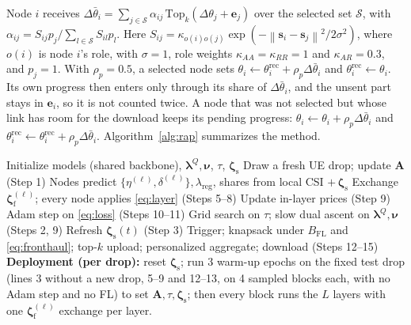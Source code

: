 \documentclass[conference]{IEEEtran}
\newcommand{\norm}[1]{\left\lVert #1 \right\rVert}
\newcommand{\zs}{\boldsymbol{\zeta}_{\mathrm{s}}}
\newcommand{\zf}{\boldsymbol{\zeta}_{\mathrm{f}}}
\begin{document}
Node $i$ receives
$\Delta\bar\theta_i = \sum_{j\in\mathcal{S}} \alpha_{ij}\,
\mathrm{Top}_k(\Delta\theta_j+\mathbf{e}_j)$ over the selected set
$\mathcal{S}$, with $\alpha_{ij} = S_{ij}p_j/\sum_{l\in\mathcal{S}}
S_{il}p_l$. Here $S_{ij} = \kappa_{o(i)o(j)}
\exp(-\norm{\mathbf{s}_i-\mathbf{s}_j}^2/2\sigma^2)$, where $o(i)$ is node
$i$'s role, with $\sigma=1$, role weights $\kappa_{AA}=\kappa_{RR}=1$ and
$\kappa_{AR}=0.3$, and $p_j=1$. With $\rho_p=0.5$, a selected node sets
$\theta_i\leftarrow\theta_i^{\mathrm{rec}}+\rho_p\Delta\bar\theta_i$ and
$\theta_i^{\mathrm{rec}}\leftarrow\theta_i$. Its own progress then enters
only through its share of $\Delta\bar\theta_i$, and the unsent part stays
in $\mathbf{e}_i$, so it is not counted twice. A node that was not selected
but whose link has room for the download keeps its pending progress:
$\theta_i\leftarrow\theta_i+\rho_p\Delta\bar\theta_i$ and
$\theta_i^{\mathrm{rec}}\leftarrow\theta_i^{\mathrm{rec}}+\rho_p
\Delta\bar\theta_i$. Algorithm~\ref{alg:rap} summarizes the method.

\begin{algorithm}[t]
\caption{RAP-FedWMMSE}
\label{alg:rap}
\begin{algorithmic}[1]
\State Initialize models (shared backbone), $\boldsymbol\lambda^Q,
       \boldsymbol\nu$, $\tau$, $\zs$
  \State Draw a fresh UE drop; update $\mathbf{A}$ (Step 1)
    \State Nodes predict $\{\eta^{(\ell)},\delta^{(\ell)}\},
           \lambda_{\mathrm{reg}}$, shares from local CSI $+\,\zs$
      \State Exchange $\zf^{(\ell)}$; every node applies
             \eqref{eq:layer} (Steps 5--8)
      \State Update in-layer prices (Step 9)
    \EndFor
    \State Adam step on \eqref{eq:loss} (Steps 10--11)
  \EndFor
  \State Grid search on $\tau$; slow dual ascent on
         $\boldsymbol\lambda^Q, \boldsymbol\nu$ (Steps 2, 9)
  \State Refresh $\zs(t)$ (Step 3)
  \State Trigger; knapsack under $B_{\mathrm{FL}}$ and
         \eqref{eq:fronthaul}; top-$k$ upload; personalized aggregate;
         download (Steps 12--15)
\EndFor
\Statex \textbf{Deployment (per drop):} reset $\zs$; run 3 warm-up epochs
on the fixed test drop (lines 3 without a new drop, 5--9 and 12--13, on 4
sampled blocks each, with no Adam step and no FL)
to set $\mathbf{A},\tau,\zs$; then every block runs the $L$ layers with one
$\zf^{(\ell)}$ exchange per layer.
\end{algorithmic}
\end{algorithm}
\end{document}
